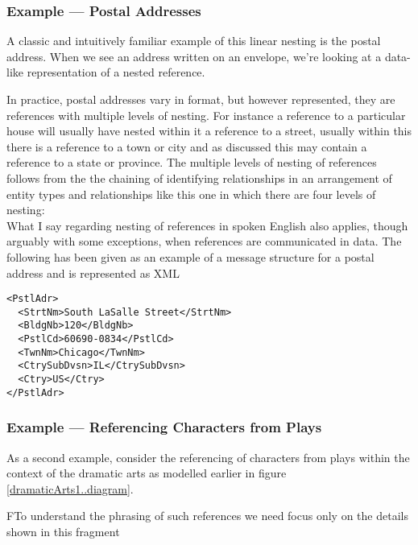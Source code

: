 \subsubsection{Example --- Postal Addresses}

A classic and intuitively familiar example of this linear nesting is the postal address. 
When we see an address written on an envelope, we’re looking at a data-like representation of a nested reference.

In practice, postal addresses vary in format, but however represented, they are references with multiple levels of nesting.
For instance a reference to a particular house will usually have nested within it a reference to a street, usually within this there is a reference to a town or city and
as discussed this may contain a reference to a state or province.  
The multiple levels of nesting of references follows from the
the chaining of identifying relationships in an arrangement
of entity types and relationships like this one in which there are four levels of nesting:
\begin{equation*}

\end{equation*}
\mynote
What I say regarding nesting of references in spoken English also applies, though arguably with some exceptions, when references are communicated in data.
The following has been given as an example of a message structure for a postal address and is represented as XML
\begin{verbatim}
<PstlAdr>
  <StrtNm>South LaSalle Street</StrtNm>
  <BldgNb>120</BldgNb>
  <PstlCd>60690-0834</PstlCd>
  <TwnNm>Chicago</TwnNm>
  <CtrySubDvsn>IL</CtrySubDvsn>
  <Ctry>US</Ctry>
</PstlAdr>
\end{verbatim}

\subsubsection{Example --- Referencing Characters from Plays}
\label{exampleReferencingCharacters}
\mynote
 As a second example, consider the referencing of characters from  plays
 within the context of  the  dramatic arts
  as modelled earlier in figure \ref{dramaticArts1..diagram}.

FTo understand the phrasing of such references we need focus only on the details shown in this fragment 
\begin{equation*}

\end{equation*}

